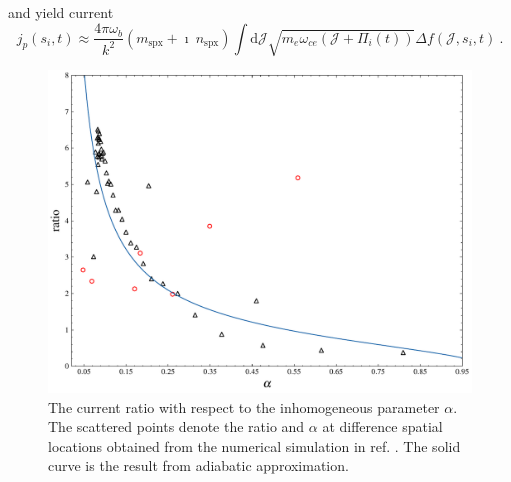 and yield current 
\begin{equation}\label{eq.adi_J}
    j_p(s_i,t) \approx \frac{4 \pi \omega_b}{k^2} \left(m_\mathrm{s p x}+\imath ~ n_\mathrm{s p x}\right) \int \mathrm{d} \mathcal{J} \sqrt{m_e \omega_{c e}(\mathcal{J}+\Pi_i(t))} \Delta f(\mathcal{J},s_i,t) ~.
\end{equation}

\begin{figure}
    \centering
    \includegraphics[scale=0.5]{img/fig_adiabatic.pdf}
    \caption{The current ratio with respect to the inhomogeneous parameter $\alpha$. The scattered points denote the ratio and $\alpha$ at difference spatial locations obtained from the numerical simulation in ref. \cite{zheng2023b}. 
    The solid curve is the result from adiabatic approximation.
    }
    \label{fig.adiabatic}
\end{figure}

